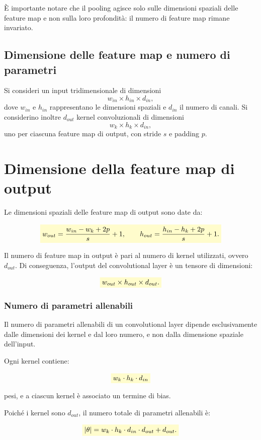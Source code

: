 \documentclass[a4paper,12pt]{report}
\newcommand{\highlight}[1]{%
\colorbox{yellow!20}{$\displaystyle #1$}%
}
\begin{document}
È importante notare che il pooling agisce solo sulle dimensioni spaziali delle feature map e non sulla loro profondità: il numero di feature map rimane invariato.

\subsection{Dimensione delle feature map e numero di parametri}

Si consideri un input tridimensionale di dimensioni
\[
w_{in} \times h_{in} \times d_{in},
\]
dove $w_{in}$ e $h_{in}$ rappresentano le dimensioni spaziali e $d_{in}$ il numero di canali.  
Si considerino inoltre $d_{out}$ kernel convoluzionali di dimensioni
\[
w_k \times h_k \times d_{in},
\]
uno per ciascuna feature map di output, con stride $s$ e padding $p$.

\section{Dimensione della feature map di output}

Le dimensioni spaziali delle feature map di output sono date da:

\[
\highlight{
w_{out} = \frac{w_{in} - w_k + 2p}{s} + 1,
\qquad
h_{out} = \frac{h_{in} - h_k + 2p}{s} + 1.}
\]

Il numero di feature map in output è pari al numero di kernel utilizzati, ovvero $d_{out}$.  
Di conseguenza, l’output del convolutional layer è un tensore di dimensioni:

\[
\highlight{
w_{out} \times h_{out} \times d_{out}.}
\]

\subsubsection{Numero di parametri allenabili}

Il numero di parametri allenabili di un convolutional layer dipende esclusivamente dalle dimensioni dei kernel e dal loro numero, e non dalla dimensione spaziale dell’input.

Ogni kernel contiene:

\[
\highlight{
w_k \cdot h_k \cdot d_{in}}
\]

pesi, e a ciascun kernel è associato un termine di bias.  

Poiché i kernel sono $d_{out}$, il numero totale di parametri allenabili è:

\[
\highlight{
|\theta| = w_k \cdot h_k \cdot d_{in} \cdot d_{out} + d_{out}.}
\]
\end{document}
